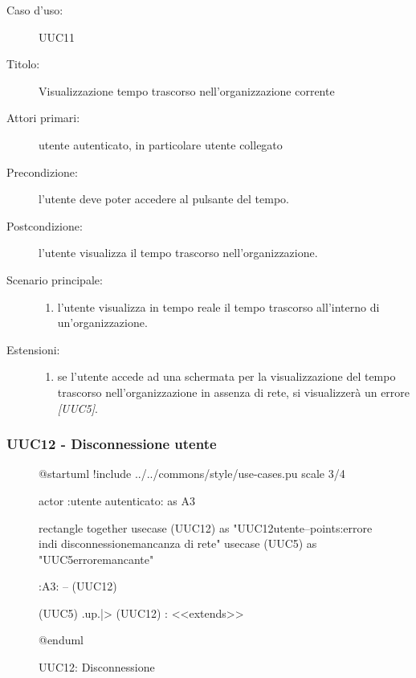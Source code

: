 \documentclass[../analisi-dei-requisiti.tex]{subfiles}
\begin{document}
\begin{description}
  \item[Caso d’uso:] UUC11
  \item[Titolo:] Visualizzazione tempo trascorso nell'organizzazione corrente
  \item[Attori primari:] utente autenticato, in particolare utente collegato
  \item[Precondizione:] l'utente deve poter accedere al pulsante del tempo.
  \item[Postcondizione:] l'utente visualizza il tempo trascorso nell'organizzazione.
  \item[Scenario principale:]
        \begin{enumerate}
          \item l'utente visualizza in tempo reale il tempo trascorso all'interno di un'organizzazione.
        \end{enumerate}
  \item[Estensioni:]
        \begin{enumerate}
          \item se l'utente accede ad una schermata per la visualizzazione del tempo trascorso nell'organizzazione in assenza di rete, si visualizzerà un errore \emph{[UUC5]}.
        \end{enumerate}
\end{description}

\subsubsection{UUC12 - Disconnessione utente}%
\label{subsub:UUC12utente}

\begin{figure}[h!]
  \centering
  \begin{plantuml}
  @startuml
  !include ../../commons/style/use-cases.pu
  scale 3/4

  actor :utente autenticato: as A3

  rectangle {
    together {
      usecase (UUC12) as "UUC12\nDisconnessione utente\n--\nExtension points:\nVisualizzazione errore in\ncaso di disconnessione\nin mancanza di rete"
      usecase (UUC5) as "UUC5\nVisualizzazione errore\nrete mancante"
    }
  }

  :A3: -- (UUC12)

  (UUC5) .up.|> (UUC12) : <<extends>>

  @enduml
  \end{plantuml}
  \caption{UUC12: Disconnessione}
  \label{fig:uuc12}
\end{figure}
\end{document}
